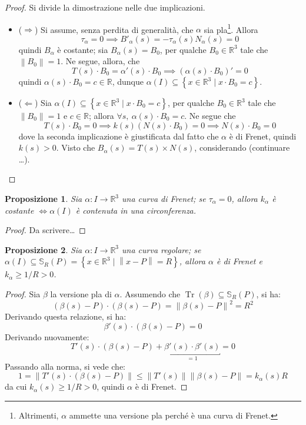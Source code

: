 \documentclass[12pt]{scrartcl}
\theoremstyle{style}
\newtheorem{prop}{Proposizione}[section]
\numberwithin{equation}{subsection}
\begin{document}
	\begin{proof}
		Si divide la dimostrazione nelle due implicazioni.
		\begin{itemize}
			\item ($\Rightarrow $) Si assume, senza perdita di generalit\`a, che $\alpha $ sia pla\footnote{Altrimenti, $\alpha $ ammette una versione pla perch\'e \`e una curva di Frenet.}.
				Allora 
				\[
				\tau _\alpha  = 0 \implies B'_\alpha (s) = - \tau _\alpha (s) N_\alpha (s) = 0 
				\] 
				quindi $B_\alpha $ \`e costante; sia $B_\alpha (s) = B_0$, per qualche $B_0\in \mathbb{R}^3$ tale che $\left\lVert B_0 \right\rVert =1$.
				Ne segue, allora, che
				\[
				T(s) \cdot B_0 = \alpha '(s) \cdot B_0\implies (\alpha (s) \cdot B_0)' = 0
				\] 
				quindi $\alpha (s)\cdot B_0 = c \in \mathbb{R}$, dunque $\alpha (I) \subseteq \left\{ x \in \mathbb{R}^3  \mid x\cdot B_0 = c \right\} $.
			\item ($\Leftarrow$) Sia $\alpha (I) \subseteq \left\{ x \in \mathbb{R}^3  \mid x\cdot B_0 =c  \right\} $, per qualche $B_0 \in \mathbb{R}^3$ tale che $\left\lVert B_0  \right\rVert  = 1$ e $c \in \mathbb{R}$; allora $\forall s, \ \alpha (s) \cdot B_0 = c$.
				Ne segue che
				\[
				T(s) \cdot B_0 = 0 \implies k(s) (N(s) \cdot B_0) = 0 \implies N(s) \cdot B_0 = 0
				\] 
				dove la seconda implicazione \`e giustificata dal fatto che $\alpha $ \`e di Frenet, quindi $k(s) > 0 $.
				Visto che $B_\alpha (s) = T(s) \times N(s)$, considerando (continuare \ldots).
		\end{itemize}
	\end{proof}
\begin{prop}
	Sia $\alpha : I \to \mathbb{R}^3$ una curva di Frenet; se $\tau _\alpha  = 0$, allora $k_\alpha $ \`e costante $\iff \alpha (I)$ \`e contenuta in una circonferenza.
\end{prop}
\begin{proof}
{\color{nred} Da scrivere\ldots}
\end{proof}
\begin{prop}
	Sia $\alpha : I \to \mathbb{R}^3$ una curva regolare; se $\alpha (I) \subseteq \mathbb{S}_R(P) = \left\{ x \in \mathbb{R}^3  \mid \left\lVert x - P \right\rVert = R \right\} $, allora $\alpha $ \`e di Frenet e $k_\alpha \ge 1 / R > 0$.
\end{prop}
\begin{proof}
	Sia $\beta $ la versione pla di $\alpha $. Assumendo che $\operatorname{Tr} (\beta ) \subseteq \mathbb{S}_R(P)$, si ha:
	\[
		(\beta (s) - P) \cdot (\beta (s) - P) = \left\lVert \beta (s) - P \right\rVert ^2 = R^2
	\] 
	Derivando questa relazione, si ha:
	\[
	\beta '(s) \cdot (\beta (s) - P) = 0
	\] 
	Derivando nuovamente:
	\[
		T'(s) \cdot (\beta (s)-P) + \underbracket{\beta '(s) \cdot \beta '(s)}_{=1}  = 0 
	\] 
	Passando alla norma, si vede che:
	\[
	1=\left\lVert T'(s) \cdot (\beta (s) - P) \right\rVert \le \left\lVert T'(s) \right\rVert \left\lVert \beta (s) - P \right\rVert = k_\alpha (s) R
\] 
	da cui $k_\alpha (s) \ge 1 / R > 0$, quindi $\alpha $ \`e di Frenet.
\end{proof}
\end{document}
